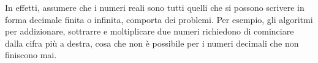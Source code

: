 In effetti, assumere che i numeri reali sono tutti quelli che si possono 
scrivere in forma decimale finita o infinita,  comporta dei problemi. 
Per esempio, gli algoritmi per addizionare, 
sottrarre e moltiplicare due numeri richiedono di cominciare dalla cifra 
più a destra, cosa che non è possibile per i numeri decimali che non 
finiscono mai. 

\begin{comment}
È possibile costruire l'insieme dei numeri reali a 
partire dall'insieme dei numeri razionali dividendoli in due insiemi~\(A\) 
e~\(B\) 
con particolari caratteristiche:
\begin{enumerate*}
 \item \(A \cap B=\emptyset\)
 \item \(A \cup B=\insQ\)
 \item \(\forall a \in A, \forall b \in B, a<b\)
\end{enumerate*}

Una coppia di insiemi con queste caratteristiche venne chiamato da 
Dedekind~(1831-1916) una \emph{sezione}, o \emph{partizione} di \(\insQ\).

Dato che \(A\) e \(B\) devono avere intersezione nulla:

\begin{itemize*}
 \item se \(A\) ha un massimo \(B\) non può avere un minimo;
 \item se \(A\) non ha un massimo \(B\) può avere un minimo;
 \item \(A\) può non avere un massimo \(B\) può non avere un minimo;
\end{itemize*}



\end{comment}
